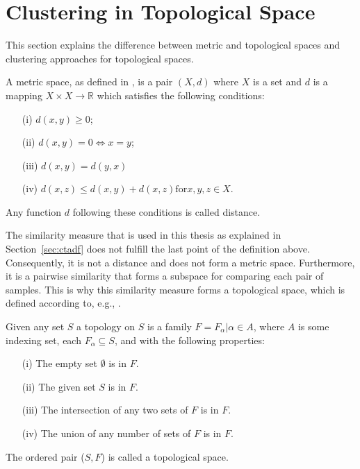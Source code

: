 \documentclass[thesis=B,english]{FITthesis}[2012/10/20]
\begin{document}
\section{Clustering in Topological Space}\label{sec:cluster_topo}
This section explains the difference between metric and topological spaces and clustering approaches for topological spaces.

A metric space, as defined in \cite{choudhary1992elements}, is a pair $(X, d)$ where $X$ is a set and $d$ is a mapping $X \times X \to \mathbb{R}$ which satisfies the following conditions:
\begin{enumerate}
    \item [(i)] $d(x, y) \geq 0$;
    \item [(ii)] $d(x, y) = 0 \iff x = y$;
    \item [(iii)] $d(x, y) = d(y, x)$
    \item [(iv)] $d(x, z) \leq d(x, y) + d(x, z) \mathrm{for} x, y, z \in X$.
\end{enumerate}
Any function $d$ following these conditions is called distance. 

The similarity measure that is used in this thesis as explained in Section~\ref{sec:ctadf} does not fulfill the last point of the definition above. Consequently, it is not a distance and does not form a metric space. Furthermore, it is a pairwise similarity that forms a subspace for comparing each pair of samples.
This is why this similarity measure forms a topological space, which is defined according to, e.g., \cite{stahl2014introduction}.

Given any set $S$ a topology on $S$ is a family $F ={F_{\alpha} | \alpha \in A}$, where $A$ is some indexing set, each $F_{\alpha}  \subseteq S$, and with the following properties:
\begin{enumerate}
    \item [(i)] The empty set $\emptyset$ is in $F$.
    \item [(ii)] The given set $S$ is in $F$.
    \item [(iii)] The intersection of any two sets of $F$ is in $F$.
    \item [(iv)] The union of any number of sets of $F$ is in $F$.
\end{enumerate}
The ordered pair ($S, F$) is called a topological space.

\end{document}
